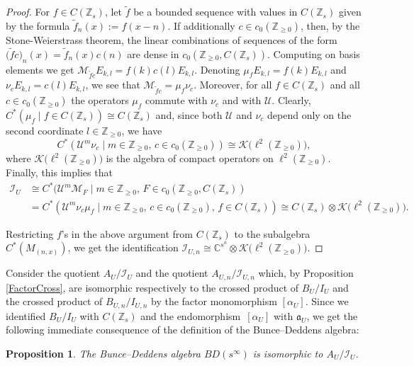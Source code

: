 \documentclass[pdftex]{sigma}
\newcommand{\C}{{\mathbb C}}
\newcommand{\Z}{{\mathbb Z}}
\newcommand{\fancyI}{\mathcal{I}}
\numberwithin{equation}{section}
\newtheorem{Proposition}[Theorem]{Proposition}
 { \theoremstyle{definition}
\newtheorem{Definition}[Theorem]{Definition}
\newtheorem{Note}[Theorem]{Note}
\newtheorem{Example}[Theorem]{Example}
\newtheorem{Remark}[Theorem]{Remark} }
\begin{document}
\begin{proof}
For $f\in C(\Z_s)$, let $\tilde f$ be a bounded sequence with values in $C(\Z_s)$ given by the formula $
\tilde f_n(x):=f(x-n)$.
If additionally $c\in c_0(\Z_{\ge0})$, then, by the Stone-Weierstrass theorem, the linear combinations of sequences of the form
$\bigl(\tilde fc\bigr)_n(x)= \tilde f_n(x)c(n)$
are dense in $c_0(\Z_{\ge0}, C(\Z_s))$. Computing on basis elements we get
$\mathcal{M}_{\tilde fc} E_{k,l} = f(k)c(l) E_{k,l}$.
Denoting $\mu_{f} E_{k,l} = f(k) E_{k,l}$ and~${ \nu_{c} E_{k,l} = c(l) E_{k,l}}$,
we see that $\mathcal{M}_{\tilde fc}=\mu_{f}\nu_{c}$. Moreover, for all $f\in C(\Z_s)$ and all $c\in c_0(\Z_{\ge0})$ the operators $\mu_f$ commute with $\nu_{c}$ and with $\mathcal{U}$. Clearly,
$C^*(\mu_f\mid f\in C(\Z_s))\cong C(\Z_s)
$
and, since both $\mathcal{U}$ and $\nu_{c}$ depend only on the second coordinate $l\in\Z_{\ge0}$, we have
\begin{equation*}
C^*(\mathcal{U}^m\nu_{c}\mid m\in \Z_{\ge0},\, c\in c_0(\Z_{\ge0}))\cong \mathcal{K}\bigl(\ell^2(\Z_{\ge0})\bigr),
\end{equation*}
where $\mathcal{K}\bigl(\ell^2(\Z_{\ge0})\bigr)$ is the algebra of compact operators on $\ell^2(\Z_{\ge0})$. Finally, this implies that
\begin{align*}
\mathcal{I}_U&\cong
C^*(\mathcal{U}^m \mathcal{M}_F\mid m\in \Z_{\ge0},\, F\in c_0(\Z_{\ge0}, C(\Z_s))\\
&=C^*(\mathcal{U}^m\nu_{c}\mu_f\mid m\in \Z_{\ge0},\, c\in c_0(\Z_{\ge0}),\, f\in C(\Z_s))\cong C(\Z_s)\otimes \mathcal{K}\bigl(\ell^2(\Z_{\ge0})\bigr).
\end{align*}

Restricting $f$'s in the above argument from $C(\Z_s)$ to the subalgebra $C^*(M_{(n,x)})$, we get the identification $\fancyI_{U,n}\cong \C^{s^n}\otimes \mathcal{K}\bigl(\ell^2(\Z_{\ge0})\bigr)$.
\end{proof}

Consider the quotient $A_U/\mathcal{I}_U$ and the quotient $A_{U,n}/\fancyI_{U,n}$ which, by Proposition \ref{FactorCross}, are isomorphic respectively to the crossed product of $B_U/I_U$ and the crossed product of $B_{U,n}/I_{U,n}$ by the factor monomorphism $[\alpha_U]$. Since we identified $B_U/I_U$ with $C(\Z_s)$ and the endomorphism~$[\alpha_U]$ with $\mathfrak{a}_U$, we get the following immediate consequence of the definition of the Bunce--Deddens algebra:
\begin{Proposition}\label{UAlgebraQuotient}
The Bunce--Deddens algebra $BD(s^\infty)$ is isomorphic to $A_U/\mathcal{I}_U$.
\end{Proposition}
\end{document}
